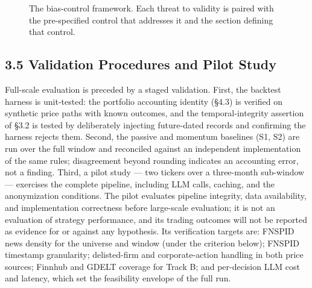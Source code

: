 \documentclass[
  12pt,
]{article}
\begin{document}
\begin{figure}[htbp]
\centering
\resizebox{\linewidth}{!}{}
\caption{The bias-control framework. Each threat to validity is paired with the pre-specified control that addresses it and the section defining that control.}
\label{fig:bias}
\end{figure}



\hypertarget{validation-procedures-and-pilot-study}{%
\subsection{3.5 Validation Procedures and Pilot
Study}\label{validation-procedures-and-pilot-study}}

Full-scale evaluation is preceded by a staged validation. First, the
backtest harness is unit-tested: the portfolio accounting identity
(§4.3) is verified on synthetic price paths with known outcomes, and the
temporal-integrity assertion of §3.2 is tested by deliberately injecting
future-dated records and confirming the harness rejects them. Second,
the passive and momentum baselines (S1, S2) are run over the full window
and reconciled against an independent implementation of the same rules;
disagreement beyond rounding indicates an accounting error, not a
finding. Third, a pilot study --- two tickers over a three-month
sub-window --- exercises the complete pipeline, including LLM calls,
caching, and the anonymization conditions. The pilot evaluates pipeline
integrity, data availability, and implementation correctness before
large-scale evaluation; it is not an evaluation of strategy performance,
and its trading outcomes will not be reported as evidence for or against
any hypothesis. Its verification targets are: FNSPID news density for
the universe and window (under the criterion below); FNSPID timestamp
granularity; delisted-firm and corporate-action handling in both price
sources; Finnhub and GDELT coverage for Track B; and per-decision LLM
cost and latency, which set the feasibility envelope of the full run.
\end{document}
